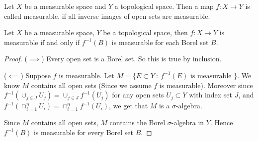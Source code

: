 \begin{definition}
   Let $X$ be a measurable space and $Y$ a topological space. Then a map $f: X \to Y$ is called measurable, if all inverse images of open sets are measurable.
\end{definition}

\begin{proposition}
  \label{prop:measurabel_sets_with_open_sets}
  Let $X$ be a measurable space, $Y$ be a topological space, then $f: X \to Y$ is measurable if and only if $f^{-1}( B)$ is measurable for each Borel set $B$.
\end{proposition}
\begin{proof}
  ($\implies$) Every open set is a Borel set. So this is true by inclusion.

  ($\impliedby$) Suppose $f$ is measurable. Let $M = \{ E \subset Y \ : \ f^{-1}(E) \textrm{  is measurable } \}$. We know $M$ contains all open sets (Since we assume $f$ is measurable). Moreover since $f^{-1}(\cup_{j \in J} U_j) = \cup_{j \in J}f^{-1}(U_j)$ for any open sets $U_j \subset Y$ with index set $J$, and $ f^{-1}(\cap_{i = 1}^{n}U_i) = \cap_{i = 1}^{n} f^{-1}(U_i)$, we get that $M$ is a $\sigma$-algebra.

  Since $M$ contains all open sets, $M$ contains the Borel $\sigma$-algebra in $Y$. Hence $f^{-1}(B)$ is  measurable for every Borel set $B$.
\end{proof}













